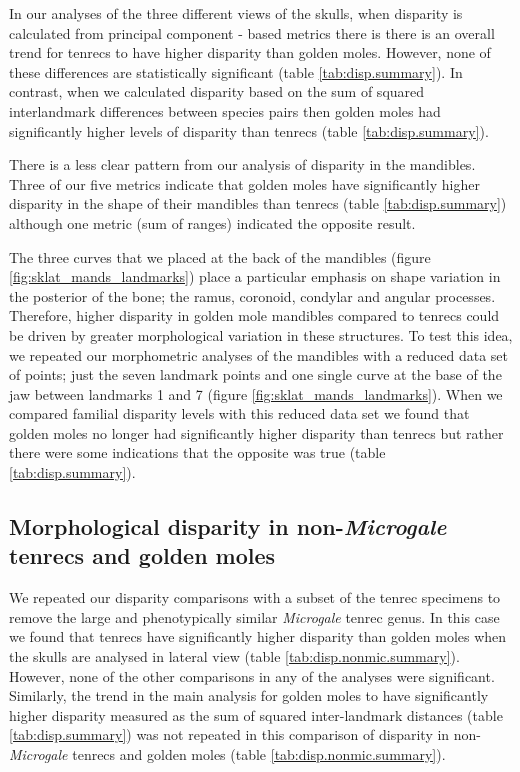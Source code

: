 \documentclass[12pt,a4paper]{article}
\begin{document}
	In our analyses of the three different views of the skulls, when disparity is calculated from principal component - based metrics there is there is an overall trend for tenrecs to have higher disparity than golden moles. However, none of these differences are statistically significant (table \ref{tab:disp.summary}). In contrast, when we calculated disparity based on the sum of squared interlandmark differences between species pairs \citep{Zelditch2012} then golden moles had significantly higher levels of disparity than tenrecs (table \ref{tab:disp.summary}).
	
	There is a less clear pattern from our analysis of disparity in the mandibles. Three of our five metrics indicate that golden moles have significantly higher disparity in the shape of their mandibles than tenrecs (table \ref{tab:disp.summary}) although one metric (sum of ranges) indicated the opposite result. 
	
	The three curves that we placed at the back of the mandibles (figure \ref{fig:sklat_mands_landmarks}) place a particular emphasis on shape variation in the posterior of the bone; the ramus, coronoid, condylar and angular processes. Therefore, higher disparity in golden mole mandibles compared to tenrecs could be driven by greater morphological variation in these structures. To test this idea, we repeated our morphometric analyses of the mandibles with a reduced data set of points; just the seven landmark points and one single curve at the base of the jaw between landmarks 1 and 7 (figure \ref{fig:sklat_mands_landmarks}). When we compared familial disparity levels with this reduced data set we found that golden moles no longer had significantly higher disparity than tenrecs but rather there were some indications that the opposite was true (table \ref{tab:disp.summary}).
	
\subsection{Morphological disparity in non-\textit{Microgale} tenrecs and golden moles} 	   
	
	We repeated our disparity comparisons with a subset of the tenrec specimens to remove the large and phenotypically similar \textit{Microgale} tenrec genus. In this case we found that tenrecs have significantly higher disparity than golden moles when the skulls are analysed in lateral view (table \ref{tab:disp.nonmic.summary}). However, none of the other comparisons in any of the analyses were significant. Similarly, the trend in the main analysis for golden moles to have significantly higher disparity measured as the sum of squared inter-landmark distances (table \ref{tab:disp.summary}) was not repeated in this comparison of disparity in non-\textit{Microgale} tenrecs and golden moles (table \ref{tab:disp.nonmic.summary}).
\end{document}
